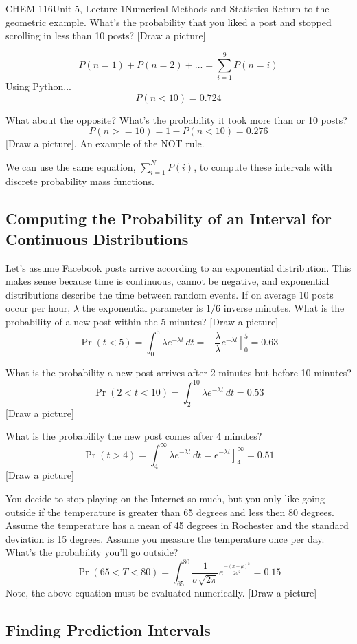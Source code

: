\documentclass{article}
\begin{document}
\begin{tdoc}{CHEM 116}{Unit 5, Lecture 1}{Numerical Methods and Statistics}
Return to the geometric example. What's the probability that you liked
a post and stopped scrolling in less than 10 posts? [Draw a picture]

\[
P(n = 1) + P(n = 2) + ... = \sum_{i=1}^{9} P(n = i)
\]
Using Python...
\[
P(n < 10) = 0.724
\]

What about the opposite? What's the probability it took more than or
10 posts?
\[
P(n >= 10) = 1 - P(n < 10) = 0.276
\]
[Draw a picture]. An example of the NOT rule.

We can use the same equation, $\sum_{i=1}^N P(i)$, to compute these
intervals with discrete probability mass functions.

\subsection{Computing the Probability of an Interval for Continuous Distributions}

Let's assume Facebook posts arrive according to an exponential
distribution. This makes sense because time is continuous, cannot be
negative, and exponential distributions describe the time between
random events. If on average 10 posts occur per hour, $\lambda$ the
exponential parameter is $1/6$ inverse minutes. What is the probability of a
new post within the 5 minutes? [Draw a picture]
\[
\Pr(t < 5) = \int_0^{5} \lambda e^{-\lambda t}\,dt = -\frac{\lambda}{\lambda}\left.e^{-\lambda t}\right]_0^{5} = 0.63
\]

What is the probability a new post arrives after 2 minutes but before 10 minutes?
\[
\Pr(2 < t < 10) = \int_{2}^{10} \lambda e^{-\lambda t}\,dt  = 0.53
\] 
[Draw a picture]

What is the probability the new post comes after 4 minutes?
\[
\Pr(t > 4) = \int_4^{\infty}  \lambda e^{-\lambda t}\,dt = \left.e^{-\lambda t}\right]_4^{\infty} = 0.51
\]
[Draw a picture]

You decide to stop playing on the Internet so much, but you only like
going outside if the temperature is greater than 65 degrees and less
then 80 degrees. Assume the temperature has a mean of 45 degrees in
Rochester and the standard deviation is 15 degrees. Assume you measure
the temperature once per day. What's the probability you'll go outside?
\[
\Pr(65 < T < 80) = \int_{65}^{80} \frac{1}{\sigma\sqrt{2\pi}}e^{\frac{-(x - \mu)^2}{2\sigma ^2}} = 0.15
\]
Note, the above equation must be evaluated numerically. [Draw a
  picture]

\subsection{Finding Prediction Intervals}


\end{tdoc}
\end{document}
